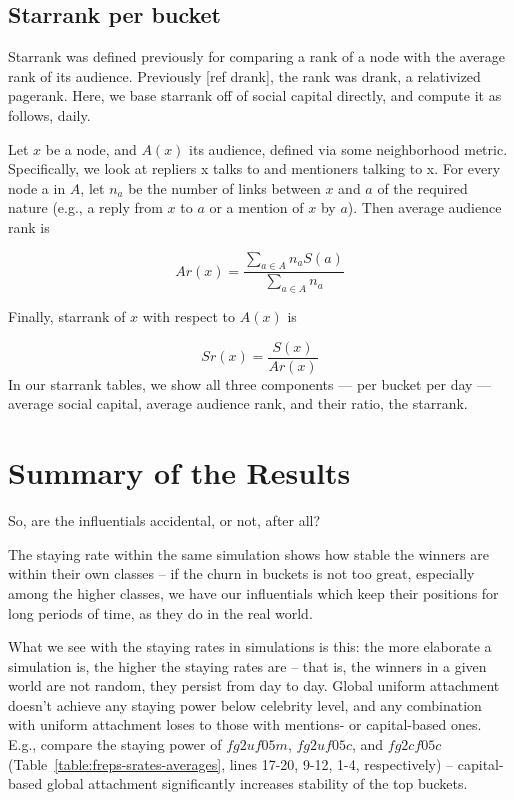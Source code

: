 \documentclass[10pt,oneside]{memoir}
\begin{document}
\subsection{Starrank per bucket}
\label{starrankperbucket}

Starrank was defined previously for comparing a rank of a node with the average rank of its audience.  Previously [ref drank], the rank was drank, a relativized pagerank.  Here, we base starrank off of social capital directly, and compute it as follows, daily.



Let $x$ be a node, and $A(x)$ its audience, defined via some neighborhood metric.  Specifically, we look at repliers x talks to and mentioners talking to x.  For every node a in $A$, let $n_a$ be the number of links between $x$ and $a$ of the required nature (e.g., a reply from $x$ to $a$ or a mention of $x$ by $a$).  Then average audience rank is

\[ Ar(x) = \frac{\sum_{a \in A} n_a S(a)}{\sum_{a \in A} n_a} \]

Finally, starrank of $x$ with respect to $A(x)$ is

\[ Sr(x) = \frac{S(x)}{Ar(x)} \]
In our starrank tables, we show all three components --- per bucket per day --- average social capital, average audience rank, and their ratio, the starrank.


\section{Summary of the Results}
\label{summaryoftheresults}

\label{sec:simulation-results}
So, are the influentials accidental, or not, after all?


The staying rate within the same simulation shows how stable the winners are within their own classes -- if the churn in buckets is not too great, especially among the higher classes, we have our influentials which keep their positions for long periods of time, as they do in the real world.


What we see with the staying rates in simulations is this: the more elaborate a simulation is, the higher the staying rates are -- that is, the winners in a given world are not random, they persist from day to day.  Global uniform attachment doesn't achieve any staying power below celebrity level, and any combination with uniform attachment loses to those with mentions- or capital-based ones.  E.g., compare the staying power of $fg2uf05m$, $fg2uf05c$, and $fg2cf05c$ (Table~\ref{table:freps-srates-averages}, lines 17-20, 9-12, 1-4, respectively) -- capital-based global attachment significantly increases stability of the top buckets.
\end{document}
